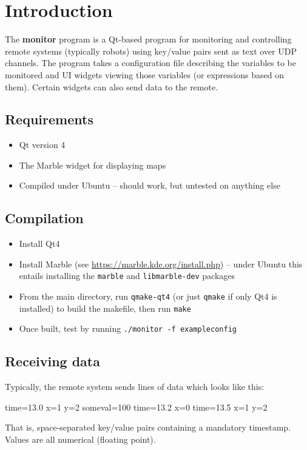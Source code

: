 \section{Introduction}
The \textbf{monitor} program is a Qt-based program for monitoring
and controlling remote systems (typically robots) using key/value pairs
sent as text over UDP channels. The program takes a configuration
file describing the variables to be monitored and UI widgets viewing
those variables (or expressions based on them). Certain widgets 
can also send data to the remote.

\subsection{Requirements}
\begin{itemize}
\item Qt version 4
\item The Marble widget for displaying maps
\item Compiled under Ubuntu -- should work, but untested on anything else
\end{itemize}

\subsection{Compilation}
\begin{itemize}
\item Install Qt4
\item Install Marble (see \url{https://marble.kde.org/install.php}) --
under Ubuntu this entails installing the \texttt{marble} and \texttt{libmarble-dev}
packages
\item From the main directory, run \texttt{qmake-qt4} (or just \texttt{qmake} if
only Qt4 is installed) to build the makefile, then run \texttt{make}
\item Once built, test by running \texttt{./monitor -f exampleconfig}
\end{itemize}

\subsection{Receiving data}
Typically, the remote system sends lines of data which looks like this:
\begin{v}
time=13.0 x=1 y=2 someval=100
time=13.2 x=0
time=13.5 x=1 y=2
\end{v}
That is, space-separated key/value pairs containing a mandatory
timestamp. Values are all numerical (floating point).

